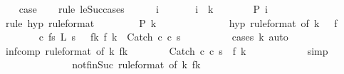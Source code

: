 \begin{isabellebody}
\isanewline
\ \ \isamarkupfalse%
\ {\isacharquery}case\isanewline
\ \ \isamarkupfalse%
\ {\isacharparenleft}rule\ le{\isacharunderscore}Suc{\isacharunderscore}cases{\isacharparenright}\isanewline
\ \ \ \ \isamarkupfalse%
\ i\ \isanewline
\ \ \ \ \isamarkupfalse%
\ {\isachardoublequoteopen}i\ {\isacharless}\ k{\isachardoublequoteclose}\isanewline
\ \ \ \ \isamarkupfalse%
\ \isamarkupfalse%
\ {\isachardoublequoteopen}{\isacharquery}P\ i{\isachardoublequoteclose}\isanewline
\ \ \ \ \ \ \isamarkupfalse%
\ {\isacharparenleft}rule\ hyp\ {\isacharbrackleft}rule{\isacharunderscore}format{\isacharbrackright}{\isacharparenright}\isanewline
\ \ \isamarkupfalse%
\isanewline
\ \ \ \ \isamarkupfalse%
\ {\isachardoublequoteopen}{\isacharquery}P\ k{\isachardoublequoteclose}\isanewline
\ \ \ \ \isamarkupfalse%
\ {\isacharminus}\isanewline
\ \ \ \ \ \ \isamarkupfalse%
\ hyp\ {\isacharbrackleft}rule{\isacharunderscore}format{\isacharcomma}\ of\ {\isachardoublequoteopen}k\ {\isacharminus}\ {}{\isachardoublequoteclose}{\isacharbrackright}\ f{\isacharunderscore}{}\isanewline
\ \ \ \ \ \ \isamarkupfalse%
\ c{\isacharprime}\ fs{\isacharprime}\ L{\isacharprime}\ s{\isacharprime}\ \ \ f{\isacharunderscore}k{\isacharcolon}\ {\isachardoublequoteopen}f\ k\ {\isacharequal}\ {\isacharparenleft}Catch\ c{\isacharprime}\ c\ s{\isacharprime}{\isacharparenright}{\isachardoublequoteclose}\isanewline
\ \ \ \ \ \ \ \ \isamarkupfalse%
\ {\isacharparenleft}cases\ k{\isacharparenright}\ auto\isanewline
\ \ \ \ \ \ \isamarkupfalse%
\ inf{\isacharunderscore}comp\ {\isacharbrackleft}rule{\isacharunderscore}format{\isacharcomma}\ of\ k{\isacharbrackright}\ f{\isacharunderscore}k\isanewline
\ \ \ \ \ \ \isamarkupfalse%
\ {\isachardoublequoteopen}{\isasymGamma}{\isasymturnstile}{\isacharparenleft}Catch\ c{\isacharprime}\ c\ s{\isacharprime}{\isacharparenright}\ {\isasymrightarrow}\ f\ {\isacharparenleft}k\ {\isacharplus}\ {}{\isacharparenright}{\isachardoublequoteclose}\isanewline
\ \ \ \ \ \ \ \ \isamarkupfalse%
\ simp\isanewline
\ \ \ \ \ \ \isamarkupfalse%
\isanewline
\ \ \ \ \ \ \isamarkupfalse%
\ not{\isacharunderscore}fin{\isacharunderscore}Suc\ {\isacharbrackleft}rule{\isacharunderscore}format{\isacharcomma}\ of\ k{\isacharbrackright}\ f{\isacharunderscore}k\isanewline

\end{isabellebody}

